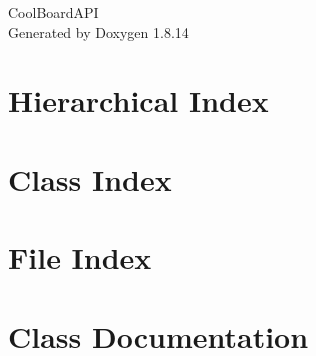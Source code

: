 \documentclass[twoside]{book}
\newcommand{\+}{\discretionary{\mbox{\scriptsize$\hookleftarrow$}}{}{}}
\newcommand{\clearemptydoublepage}{%
  \newpage{\pagestyle{empty}\cleardoublepage}%
}
\begin{document}
\hypersetup{pageanchor=false,
             bookmarksnumbered=true,
             pdfencoding=unicode
            }
\begin{titlepage}
\vspace*{7cm}
\begin{center}%
{\Large Cool\+Board\+A\+PI }\\
\vspace*{1cm}
{\large Generated by Doxygen 1.8.14}\\
\end{center}
\end{titlepage}
\clearemptydoublepage
{}
\tableofcontents
\clearemptydoublepage
{}
\hypersetup{pageanchor=true}

\chapter{Hierarchical Index}

\chapter{Class Index}

\chapter{File Index}

\chapter{Class Documentation}






























\end{document}
